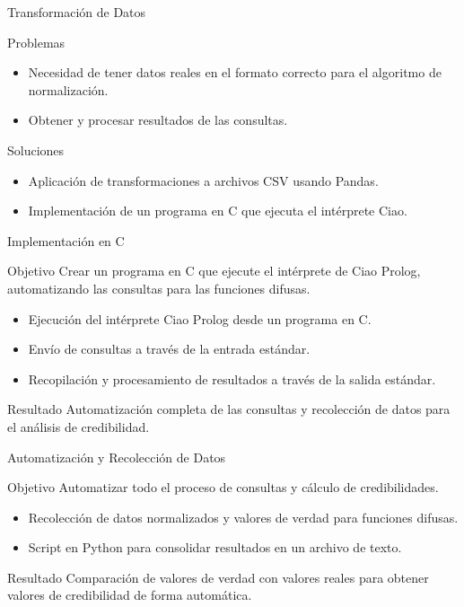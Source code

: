 \documentclass{beamer}
\begin{document}
\begin{frame}{Transformación de Datos}
    \begin{block}{Problemas}
        \begin{itemize}
            \item Necesidad de tener datos reales en el formato correcto para el algoritmo de normalización.
            \item Obtener y procesar resultados de las consultas.
        \end{itemize}
    \end{block}
    \begin{block}{Soluciones}
        \begin{itemize}
            \item Aplicación de transformaciones a archivos CSV usando Pandas.
            \item Implementación de un programa en C que ejecuta el intérprete Ciao.
        \end{itemize}
    \end{block}
\end{frame}

\begin{frame}{Implementación en C}
    \begin{block}{Objetivo}
        Crear un programa en C que ejecute el intérprete de Ciao Prolog, automatizando las consultas para las funciones difusas.
    \end{block}
    \begin{itemize}
        \item Ejecución del intérprete Ciao Prolog desde un programa en C.
        \item Envío de consultas a través de la entrada estándar.
        \item Recopilación y procesamiento de resultados a través de la salida estándar.
    \end{itemize}
    \begin{block}{Resultado}
        Automatización completa de las consultas y recolección de datos para el análisis de credibilidad.
    \end{block}
\end{frame}

\begin{frame}{Automatización y Recolección de Datos}
    \begin{block}{Objetivo}
        Automatizar todo el proceso de consultas y cálculo de credibilidades.
    \end{block}
    \begin{itemize}
        \item Recolección de datos normalizados y valores de verdad para funciones difusas.
        \item Script en Python para consolidar resultados en un archivo de texto.
    \end{itemize}
    \begin{block}{Resultado}
        Comparación de valores de verdad con valores reales para obtener valores de credibilidad de forma automática.
    \end{block}
\end{frame}
\end{document}
